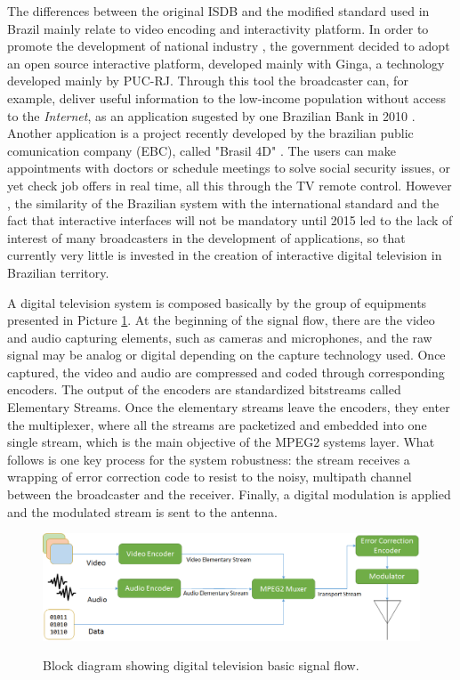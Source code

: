 \documentclass[
	12pt,				%
	openright,			%
	twoside,			%
	a4paper,			%
	brazil,
	french,				%
	english
	]{abntex2}
\begin{document}
The differences between the original ISDB and the modified standard used in Brazil mainly relate to video encoding and interactivity platform. In order to promote the development of national industry , the government decided to adopt an open source interactive platform, developed mainly with Ginga, a technology developed mainly by PUC-RJ\cite{PUCRJ}. Through this tool the broadcaster can, for example, deliver useful information to the low-income population without access to the \textit{Internet}, as an application sugested by one Brazilian Bank in 2010 \cite{caixa}. Another application is a project recently developed by the brazilian public comunication company (EBC), called "Brasil 4D" \cite{consultas}. The users can make appointments with doctors or schedule meetings to solve social security issues, or yet check job offers in real time, all this through the TV remote control. However , the similarity of the Brazilian system with the international standard and the fact that interactive interfaces will not be mandatory until 2015 led to the lack of interest of many broadcasters in the development of applications, so that currently very little is invested in the creation of interactive digital television in Brazilian territory.

A digital television system is composed basically by the group of equipments presented in Picture \ref{fig:diagrama_blocos_tvd}. At the beginning of the signal flow, there are the video and audio capturing elements, such as cameras and microphones, and the raw signal may be analog or digital depending on the capture technology used. Once captured, the video and audio are compressed and coded through corresponding encoders. The output of the encoders are standardized bitstreams called Elementary Streams. Once the elementary streams leave the encoders, they enter the multiplexer, where all the streams are packetized and embedded into one single stream, which is the main objective of the MPEG2 systems layer. What follows is one key process for the system robustness: the stream receives a wrapping of error correction code to resist to the noisy, multipath channel between the broadcaster and the receiver. Finally, a digital modulation is applied and the modulated stream is sent to the antenna.
 
 \begin{figure}
\centering
\caption{Block diagram showing digital television basic signal flow.}
\includegraphics[width=1\linewidth]{figuras/diagrama_blocos_tvd.png}
\label{fig:diagrama_blocos_tvd}
\end{figure}
 
\end{document}
